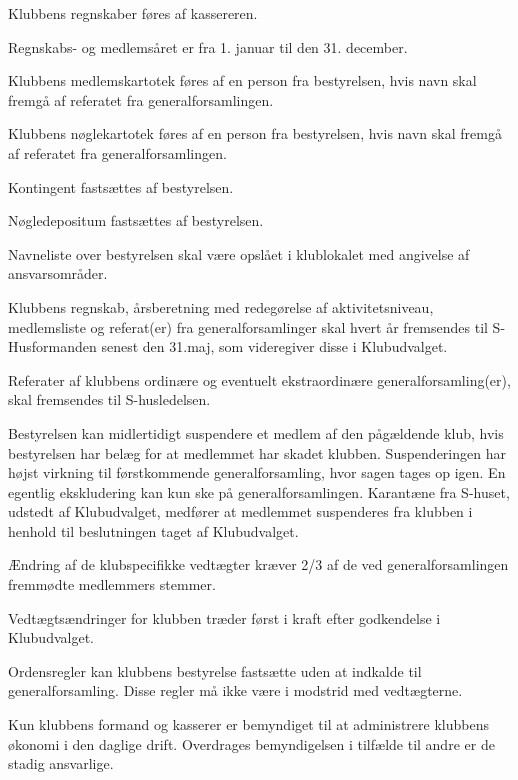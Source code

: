 \begin{list}
\item Klubbens regnskaber føres af kassereren.

 Regnskabs- og medlemsåret er fra 1. januar til den 31. december.

 Klubbens medlemskartotek føres af en person fra bestyrelsen, hvis navn skal fremgå af referatet fra generalforsamlingen.

 Klubbens nøglekartotek føres af en person fra bestyrelsen, hvis navn skal fremgå af referatet fra generalforsamlingen.

 Kontingent fastsættes af bestyrelsen.

 Nøgledepositum fastsættes af bestyrelsen.
\item Navneliste over bestyrelsen skal være opslået i klublokalet med angivelse af ansvarsområder.

\item Klubbens regnskab, årsberetning med redegørelse af aktivitetsniveau, medlemsliste og referat(er) fra generalforsamlinger skal hvert år fremsendes til S-Husformanden senest den 31.maj, som videregiver disse i Klubudvalget.

\item Referater af klubbens ordinære og eventuelt ekstraordinære generalforsamling(er), skal fremsendes til S-husledelsen.

\item Bestyrelsen kan midlertidigt suspendere et medlem af den pågældende klub, hvis bestyrelsen har belæg for at medlemmet har skadet klubben. Suspenderingen har højst virkning til førstkommende generalforsamling, hvor sagen tages op igen. En egentlig ekskludering kan kun ske på generalforsamlingen. Karantæne fra S-huset, udstedt af Klubudvalget, medfører at medlemmet suspenderes fra klubben i henhold til beslutningen taget af Klubudvalget.

\item Ændring af de klubspecifikke vedtægter kræver 2/3 af de ved generalforsamlingen fremmødte medlemmers stemmer.

 Vedtægtsændringer for klubben træder først i kraft efter godkendelse i Klubudvalget.

 Ordensregler kan klubbens bestyrelse fastsætte uden at indkalde til generalforsamling. Disse regler må ikke være i modstrid med vedtægterne.

\item Kun klubbens formand og kasserer er bemyndiget til at administrere klubbens økonomi i den daglige drift. Overdrages bemyndigelsen i tilfælde til andre er de stadig ansvarlige.


\end{list}
